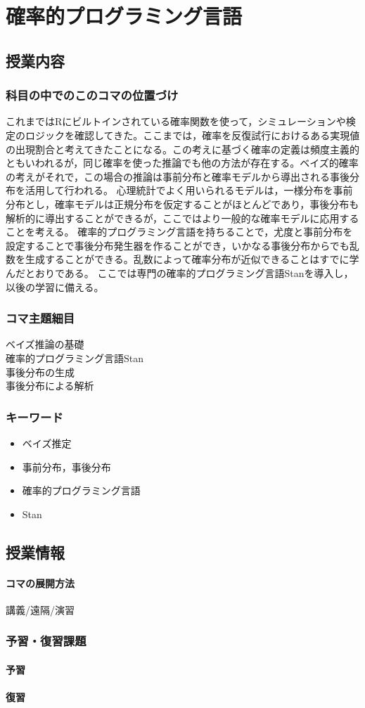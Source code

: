 \section{確率的プログラミング言語}
\subsection{授業内容}
\subsubsection{科目の中でのこのコマの位置づけ}
これまではRにビルトインされている確率関数を使って，シミュレーションや検定のロジックを確認してきた。ここまでは，確率を反復試行におけるある実現値の出現割合と考えてきたことになる。この考えに基づく確率の定義は頻度主義的ともいわれるが，同じ確率を使った推論でも他の方法が存在する。ベイズ的確率の考えがそれで，この場合の推論は事前分布と確率モデルから導出される事後分布を活用して行われる。
心理統計でよく用いられるモデルは，一様分布を事前分布とし，確率モデルは正規分布を仮定することがほとんどであり，事後分布も解析的に導出することができるが，ここではより一般的な確率モデルに応用することを考える。
確率的プログラミング言語を持ちることで，尤度と事前分布を設定することで事後分布発生器を作ることができ，いかなる事後分布からでも乱数を生成することができる。乱数によって確率分布が近似できることはすでに学んだとおりである。
ここでは専門の確率的プログラミング言語Stanを導入し，以後の学習に備える。
\subsubsection{コマ主題細目}
\begin{description}
	\item[ベイズ推論の基礎]
	\item[確率的プログラミング言語Stan]
	\item[事後分布の生成] 
	\item[事後分布による解析]  
\end{description}
\subsubsection{キーワード}
\begin{itemize}
	\item ベイズ推定
	\item 事前分布，事後分布
	\item 確率的プログラミング言語
	\item Stan
\end{itemize}
\subsection{授業情報}
\paragraph{コマの展開方法}
講義/遠隔/演習
\subsubsection{予習・復習課題}
\paragraph{予習}
\paragraph{復習}